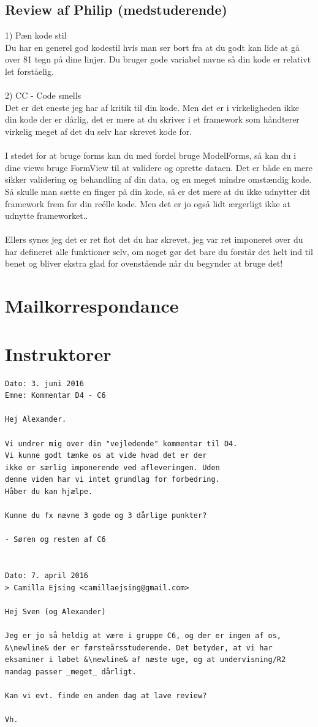 \documentclass[]{article}
\begin{document}
\subsection{Review af Philip (medstuderende)}
1) Pæn kode stil \\
Du har en generel god kodestil hvis man ser bort fra at du godt kan lide at gå over 81 tegn på dine linjer. Du bruger gode variabel navne så din kode er relativt let forståelig. \\ \\
2) CC - Code smells \\
Det er det eneste jeg har af kritik til din kode. Men det er i virkeligheden ikke din kode der er dårlig, det er mere at du skriver i et framework som håndterer virkelig meget af det du selv har skrevet kode for. \\ \\
I stedet for at bruge forms kan du med fordel bruge ModelForms, så kan du i dine views bruge FormView til at validere og oprette dataen. Det er både en mere sikker validering og behandling af din data, og en meget mindre omstændig kode. Så skulle man sætte en finger på din kode, så er det mere at du ikke udnytter dit framework frem for din reélle kode. Men det er jo også lidt ærgerligt ikke at udnytte frameworket.. \\ \\
Ellers synes jeg det er ret flot det du har skrevet, jeg var ret imponeret over du har defineret alle funktioner selv, om noget gør det bare du forstår det helt ind til benet og bliver ekstra glad for ovenstående når du begynder at bruge det!
%
\newpage
\section{Mailkorrespondance} \label{Mails}
\section*{Instruktorer}
\begin{lstlisting}[language=Gmail]
Dato: 3. juni 2016
Emne: Kommentar D4 - C6

Hej Alexander.

Vi undrer mig over din "vejledende" kommentar til D4.
Vi kunne godt tænke os at vide hvad det er der
ikke er særlig imponerende ved afleveringen. Uden
denne viden har vi intet grundlag for forbedring.
Håber du kan hjælpe.

Kunne du fx nævne 3 gode og 3 dårlige punkter?

- Søren og resten af C6


Dato: 7. april 2016
> Camilla Ejsing <camillaejsing@gmail.com>

Hej Sven (og Alexander)

Jeg er jo så heldig at være i gruppe C6, og der er ingen af os, &\newline& der er førsteårsstuderende. Det betyder, at vi har eksaminer i løbet &\newline& af næste uge, og at undervisning/R2 mandag passer _meget_ dårligt.

Kan vi evt. finde en anden dag at lave review?

Vh.
\end{lstlisting}
\end{document}

